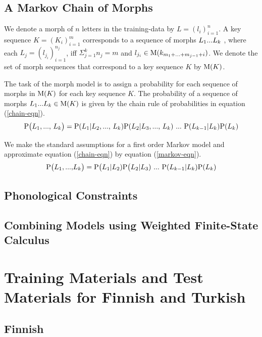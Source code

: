 \documentclass{llncs}
\begin{document}
\subsection{A Markov Chain of Morphs}

We denote a morph of $n$ letters in the training-data by
$L = (l_i)_{i=1}^{n}$. A key sequence $K = (K_i)_{i=1}^{m}$ corresponds to a
sequence of morphs $L_1{\rm ... }L_k$ , where each $L_j = (l_{j_i})_{i=1}^{n_j}$, iff $\Sigma_{j = 1}^{k} n_j = m$ and
$l_{j_i} \in {\rm M}(k_{m_1 + {\rm ... } + m_{j - 1} + i})$. We denote
the set of morph sequences that correspond to a key sequence
$K$ by ${\rm M}(K)$.

The task of the morph model is to assign a probability for each
sequence of morphs in ${\rm M}(K)$ for each key
sequence $K$. The probability of a sequence of morphs $L_1{\rm ... }L_k \in {\rm M}(K)$ is given by the chain rule of probabilities in equation (\ref{chain-eqn}).
\begin{equation}\label{chain-eqn}
{\rm P}\big(L_1{\rm, ..., }\ L_k\big) = {\rm P}(L_1 | L_2 {\rm, ..., }\ L_k) {\rm P}(L_2 | L_3 {\rm, ..., }\ L_k)\ {\rm ... }\ {\rm P}(L_{k-1} | L_k){\rm P}(L_k)
\end{equation}

We make the standard assumptions for a first order Markov model and approximate equation (\ref{chain-eqn}) by equation (\ref{markov-eqn}).
\begin{equation}\label{markov-eqn}
{\rm P}\big(L_1{\rm, ..., }L_k\big) = {\rm P}\big(L_1 | L_2){\rm P}\big(L_2 | L_3)\ {\rm ... }\ {\rm P}(L_{k-1} | L_k){\rm P}(L_k)
\end{equation}

\subsection{Phonological Constraints}

\subsection{Combining Models using Weighted Finite-State Calculus}

\section{Training Materials and Test Materials for Finnish and Turkish}\label{data}

\subsection{Finnish}
\end{document}

